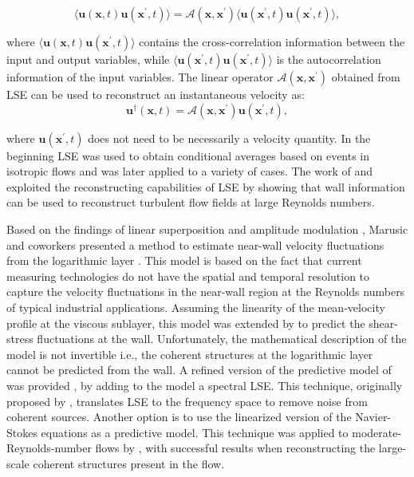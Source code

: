\begin{equation}
  \bigl\langle \boldsymbol{u}(\boldsymbol{x}, t) \boldsymbol{u}(\boldsymbol{x^{\prime}}, t)\bigl\rangle=\mathcal{A}(\boldsymbol{x},\boldsymbol{x^{\prime}})\bigl\langle \boldsymbol{u}(\boldsymbol{x^{\prime}}, t) \boldsymbol{u}(\boldsymbol{x^{\prime}}, t)\bigl\rangle,
  \label{ch02:eq12}
\end{equation}

\noindent where $\bigl\langle \boldsymbol{u}(\boldsymbol{x}, t) \boldsymbol{u}(\boldsymbol{x^{\prime}}, t)\bigl\rangle$ contains the cross-correlation information between the input and output variables, while $\bigl\langle \boldsymbol{u}(\boldsymbol{x^{\prime}}, t) \boldsymbol{u}(\boldsymbol{x^{\prime}}, t)\bigl\rangle$ is the autocorrelation information of the input variables.
The linear operator $\mathcal{A}(\boldsymbol{x},\boldsymbol{x^{\prime}})$ obtained from LSE can be used to reconstruct an instantaneous velocity as:
\begin{equation}
  \boldsymbol{u}^{\dagger}(\boldsymbol{x},t)=\mathcal{A}(\boldsymbol{x},\boldsymbol{x^{\prime}})\boldsymbol{u}(\boldsymbol{x^{\prime}}, t),
  \label{ch02:eq13}
\end{equation}

\noindent where $\boldsymbol{u}(\boldsymbol{x^{\prime}}, t)$ does not need to be necessarily a velocity quantity.
In the beginning LSE was used to obtain conditional averages based on events in isotropic flows and was later applied to a variety of cases.
The work of \citet{encinar2018reconstructing} and \citet{encinar2019logarithmic} exploited the reconstructing capabilities of LSE by showing that wall information can be used to reconstruct turbulent flow fields at large Reynolds numbers.

Based on the findings of linear superposition and amplitude modulation \citep{hutchins2007large,mathis2009large}, Marusic and coworkers presented a method to estimate near-wall velocity fluctuations from the logarithmic layer \citep{marusic2010predictive,mathis2011predictive}.
This model is based on the fact that current measuring technologies do not have the spatial and temporal resolution to capture the velocity fluctuations in the near-wall region at the Reynolds numbers of typical industrial applications.
Assuming the linearity of the mean-velocity profile at the viscous sublayer, this model was extended by \citet{mathis2013estimating} to predict the shear-stress fluctuations at the wall.
Unfortunately, the mathematical description of the model is not invertible i.e., the coherent structures at the logarithmic layer cannot be predicted from the wall.
A refined version of the predictive model of \citet{marusic2010predictive} was provided \citet{baars2016spectral}, by adding to the model a spectral LSE.
This technique, originally proposed by \citet{tinney2006spectral}, translates LSE to the frequency space to remove noise from coherent sources.
Another option is to use the linearized version of the Navier-Stokes equations as a predictive model.
This technique was applied to moderate-Reynolds-number flows by \citet{illingworth2018estimating}, with successful results when reconstructing the large-scale coherent structures present in the flow.

